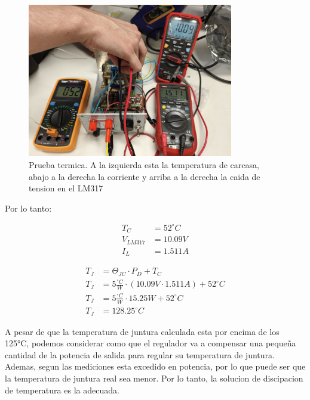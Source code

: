 \documentclass[chaptersright]{informeutn}
\begin{document}
        \begin{figure}[!h]
          \centering
          \includegraphics[width=0.8\textwidth]{pictures/reg_prueb-term.jpeg}
          \caption{Prueba termica. A la izquierda esta la temperatura de carcasa, abajo a la derecha la corriente y
                   arriba a la derecha la caida de tension en el LM317}
        \end{figure}

        Por lo tanto:
        \begin{figure}[!h]
          \centering
          \begin{minipage}{0.4\textwidth}
            \begin{align*}
              T_C &= 52^\circ C\\[6pt]
              V_{LM317} &= 10.09V\\[6pt]
              I_L &= 1.511A
            \end{align*}
          \end{minipage}
          \begin{minipage}{0.4\textwidth}
            \begin{align*}
              T_J &= \Theta_{JC} \cdot P_D + T_C\\[6pt]
              T_J &= 5\frac{^\circ C}{W} \cdot (10.09V \cdot 1.511A) + 52^\circ C\\[6pt]
              T_J &= 5\frac{^\circ C}{W} \cdot 15.25W + 52^\circ C\\[6pt]
              T_J &= 128.25^\circ C
            \end{align*}
          \end{minipage}
        \end{figure}

        A pesar de que la temperatura de juntura calculada esta por encima de los 125°C, podemos considerar como que
        el regulador va a compensar una pequeña cantidad de la potencia de salida para regular su temperatura de
        juntura. Ademas, segun las mediciones esta excedido en potencia, por lo que puede ser que la temperatura de
        juntura real sea menor. Por lo tanto, la solucion de discipacion de temperatura es la adecuada.
\end{document}

